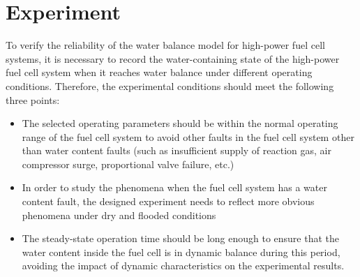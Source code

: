 \section{Experiment}
To verify the reliability of the water balance model for high-power fuel cell systems, it is necessary to record the water-containing state of the high-power fuel cell system when it reaches water balance under different operating conditions. Therefore, the experimental conditions should meet the following three points:
\begin{itemize}
\item The selected operating parameters should be within the normal operating range of the fuel cell system to avoid other faults in the fuel cell system other than water content faults (such as insufficient supply of reaction gas, air compressor surge, proportional valve failure, etc.)
\item In order to study the phenomena when the fuel cell system has a water content fault, the designed experiment needs to reflect more obvious phenomena under dry and flooded conditions
\item The steady-state operation time should be long enough to ensure that the water content inside the fuel cell is in dynamic balance during this period, avoiding the impact of dynamic characteristics on the experimental results.
\end{itemize}
